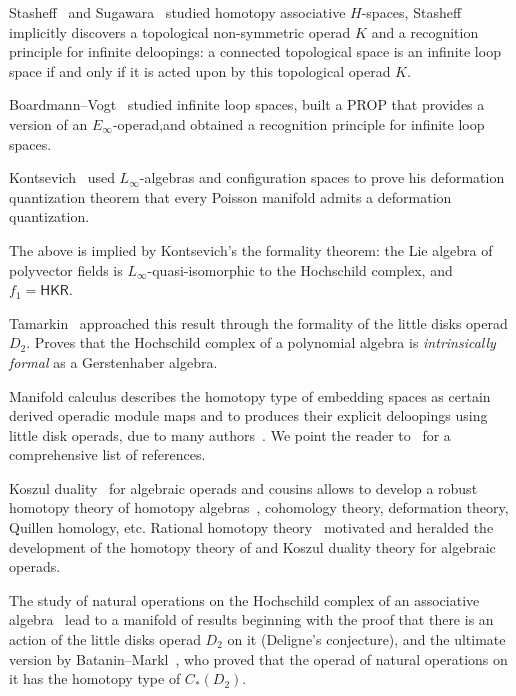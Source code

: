 \begin{tenumerate}
\item Stasheff~\cites{Stasheff1970,Stasheff1963,Stasheff1963a} and 
Sugawara~\cite{Sugawara55} studied homotopy associative $H$-spaces, Stasheff 
implicitly discovers a topological non-symmetric operad $K$ and a recognition 
principle for infinite deloopings: a connected topological space is an infinite
loop space if and only if it is acted upon by this topological operad $K$. 

\item Boardmann--Vogt~\cite{Boardman1973,bams/1183530111} studied infinite loop 
spaces, built a PROP that provides a version of an $E_\infty$-operad,and obtained
a recognition principle for infinite loop spaces.

\item Kontsevich~\cite{Kontsevich2003} used $L_\infty$-algebras and configuration 
spaces to prove his deformation quantization theorem that every Poisson manifold
admits a deformation quantization.

\item The above is implied by Kontsevich's the formality theorem: the Lie algebra 
of polyvector fields is $L_\infty$-quasi-isomorphic to the Hochschild complex, and 
$f_1 = \mathsf{HKR}$. 

\item Tamarkin~\cite{Tamarkin2003,Hinich2003} approached this result through 
the formality of the little disks operad $D_2$. Proves that the Hochschild 
complex of a polynomial algebra is \emph{intrinsically formal} as a 
Gerstenhaber algebra.

\item Manifold calculus describes the homotopy type of embedding spaces as certain 
derived operadic module maps and to produces their explicit deloopings using 
little disk operads, due to many authors~\cite{Arone2007, Goodwillie1999, Weiss1996, 
Weiss1999}. We point the reader to~\cite{IdrissiPeccot} for a comprehensive
list of references.

\item Koszul duality~\cite{Ginzburg1994} for algebraic operads and cousins allows
to develop a robust homotopy theory of homotopy algebras~\cite{Vallette2020,
Hinich1999}, cohomology theory, deformation theory, Quillen homology, etc. 
Rational homotopy theory~\cite{Quillen1967,Felix2001,Sullivan1977} motivated 
and heralded the development of the homotopy theory of and Koszul duality
theory for algebraic operads.

\item The study of natural operations on the Hochschild complex of an associative
algebra~\cite{Hochschild1945} lead to a manifold of results beginning with the 
proof that there is an action of the little disks operad $D_2$ on it (Deligne's
conjecture), and the ultimate version by Batanin--Markl~\cite{Batanin2014},
who proved that the operad of natural operations on it has the homotopy type 
of $C_*(D_2)$.  

\end{tenumerate}

